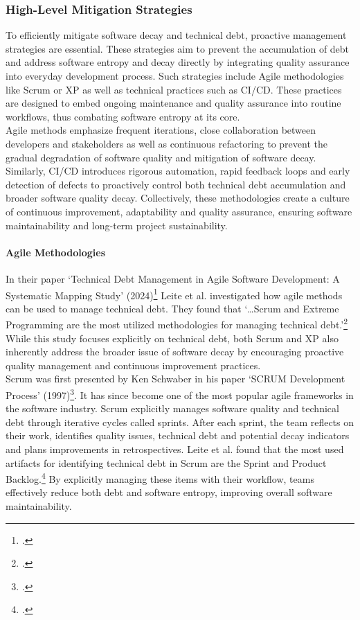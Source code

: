 \subsubsection{High-Level Mitigation Strategies}
To efficiently mitigate software decay and technical debt, proactive management strategies are essential. These strategies aim to prevent the accumulation of 
debt and address software entropy and decay directly by integrating quality assurance into everyday development process.
Such strategies include Agile methodologies like Scrum or \ac{XP} as well as technical practices
such as \ac{CI/CD}. These practices are designed to embed ongoing maintenance and quality assurance into routine workflows, thus combating software entropy at its core.\\
Agile methods emphasize frequent iterations, close collaboration between developers and stakeholders as well as continuous refactoring to prevent the
gradual degradation of software quality and mitigation of software decay.\\
Similarly, \ac{CI/CD} introduces rigorous automation, rapid feedback loops and early detection of defects to proactively control both technical debt accumulation
and broader software quality decay. Collectively, these methodologies create a culture of continuous improvement, adaptability and quality assurance, 
ensuring software maintainability and long-term project sustainability.\\

\paragraph{Agile Methodologies}
In their paper `Technical Debt Management in Agile Software Development: A Systematic Mapping Study' (2024)\footcite{leiteTechnicalDebtManagement2024} Leite et al.
investigated how agile methods can be used to manage technical debt. They found that `\ldots Scrum and Extreme Programming are the most utilized methodologies 
for managing technical debt.'\footcite[318]{leiteTechnicalDebtManagement2024} While this study focuses explicitly on technical debt, both Scrum and \ac{XP}
also inherently address the broader issue of software decay by encouraging proactive quality management and continuous improvement practices.\\
Scrum was first presented by Ken Schwaber in his paper `SCRUM Development Process' (1997)\footcite{schwaberSCRUMDevelopmentProcess1997}. 
It has since become one of the most popular agile frameworks in the software industry. Scrum explicitly manages software quality and technical debt through iterative cycles called sprints.
After each sprint, the team reflects on their work, identifies quality issues, technical debt and potential decay indicators and plans improvements in
retrospectives. Leite et al. found that the most used artifacts for identifying technical debt in Scrum are the Sprint and Product Backlog.\footcite[315]{leiteTechnicalDebtManagement2024}
By explicitly managing these items with their workflow, teams effectively reduce both debt and software entropy, improving overall software maintainability.\\

